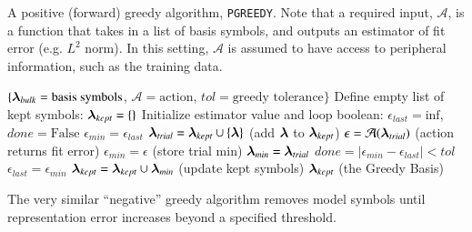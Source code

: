 \documentclass[twocolumn,aps,prd,floatfix,preprintnumbers,a4paper,nofootinbib,
superscriptaddress,10pt]{revtex4-1}
\def\pgreedy{\texttt{PGREEDY}}
\begin{document}
{\scriptsize
\begin{algorithm}[H]
  \caption{A positive (forward) greedy algorithm, \pgreedy{}. Note that a required input, $\mathcal{A}$, is a function that takes in a list of basis symbols, and outputs an estimator of fit error (e.g. $L^2$ norm). In this setting, $\mathcal{A}$ is assumed to have access to peripheral information, such as the training data.}
  \label{alg:pgreedy}
  \begin{algorithmic}[1]
     $ \{ {\bm{\lambda}}_{bulk} = \text{basis symbols}$, $\mathcal{A} = \text{action}$, $tol=\text{greedy tolerance}\}$
    \vskip 10pt
    \State Define empty list of kept symbols: ${\bm{\lambda}}_{kept} = \{\}$
    \State Initialize estimator value and loop boolean: $\epsilon_{last} = \mathrm{inf}$, $done = \text{False}$
      \State $\epsilon_{min} = \epsilon_{last}$
        \State ${\bm{\lambda}}_{trial} = {\bm{\lambda}}_{kept} \cup \{{\bm{\lambda}}\}$ {\hskip0.525in} (add ${\bm{\lambda}}$ to ${\bm{\lambda}}_{kept}$)
        \State $\epsilon = \mathcal{A}({\bm{\lambda}}_{trial})$ {\hskip0.70in} (action returns fit error)
          \State $\epsilon_{min} = \epsilon$  {\hskip0.825in} (store trial min)
          \State ${\bm{\lambda}}_{min} = {\bm{\lambda}}_{trial}$
        \EndIf
      \EndFor
      \State $done = |\epsilon_{min}-\epsilon_{last}|<tol$ %
        \State $\epsilon_{last} = \epsilon_{min}$
        \State ${\bm{\lambda}}_{kept} = {\bm{\lambda}}_{kept} \cup {\bm{\lambda}}_{min}$ {\hskip0.4in} (update kept symbols)
      \EndIf
    \EndWhile
    \vskip 10pt
     ${\bm{\lambda}}_{kept}$ (the Greedy Basis)
  \end{algorithmic}
\end{algorithm}
}
%
\par The very similar ``negative'' greedy algorithm removes model symbols until representation error increases beyond a specified threshold.
%
%
%
%
\end{document}
